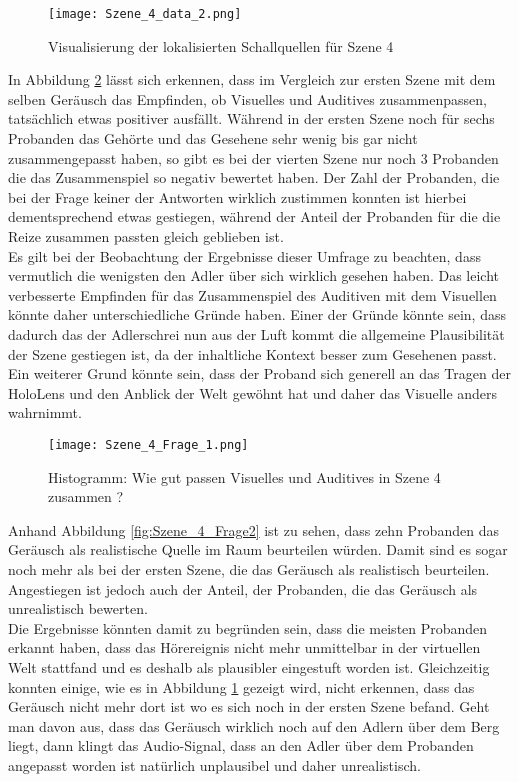    \begin{figure}[H]
\centering
\texttt{[image: Szene\_4\_data\_2.png]}
\caption{Visualisierung der lokalisierten Schallquellen für Szene 4}
\label{fig:Szene_4_data}
\end{figure} 

In Abbildung \ref{fig:Szene_4_Frage1} lässt sich erkennen, dass im Vergleich zur ersten Szene mit dem selben Geräusch das Empfinden, ob Visuelles und Auditives zusammenpassen, tatsächlich etwas positiver ausfällt. Während in der ersten Szene noch für sechs Probanden das Gehörte und das Gesehene sehr wenig bis gar nicht zusammengepasst haben, so gibt es bei der vierten Szene  nur noch 3 Probanden die das Zusammenspiel so negativ bewertet haben. Der Zahl der Probanden, die bei der Frage keiner der Antworten wirklich zustimmen konnten ist hierbei dementsprechend etwas gestiegen, während der Anteil der Probanden für die die Reize zusammen passten gleich geblieben ist.\\ 

Es gilt bei der Beobachtung der Ergebnisse dieser Umfrage zu beachten, dass vermutlich die wenigsten den Adler über sich wirklich gesehen haben. Das leicht verbesserte Empfinden für das Zusammenspiel des Auditiven mit dem Visuellen könnte daher unterschiedliche Gründe haben. Einer der Gründe könnte sein, dass dadurch das der Adlerschrei nun aus der Luft kommt die allgemeine Plausibilität der Szene gestiegen ist, da der inhaltliche Kontext besser zum Gesehenen passt. Ein weiterer Grund könnte sein, dass der Proband sich generell an das Tragen der HoloLens und den Anblick der Welt gewöhnt hat und daher das Visuelle anders wahrnimmt. 


   \begin{figure}[H]
\centering
\texttt{[image: Szene\_4\_Frage\_1.png]}
\caption{Histogramm: Wie gut passen Visuelles und Auditives in Szene 4 zusammen ?}
\label{fig:Szene_4_Frage1}
\end{figure} 

Anhand Abbildung \ref{fig:Szene_4_Frage2} ist zu sehen, dass zehn Probanden das Geräusch als realistische Quelle im Raum beurteilen würden. Damit sind es sogar noch mehr als bei der ersten Szene, die das Geräusch als realistisch beurteilen. Angestiegen ist jedoch auch der Anteil, der Probanden, die das Geräusch als unrealistisch bewerten. \\

Die Ergebnisse könnten damit zu begründen sein, dass die meisten Probanden erkannt haben, dass das Hörereignis nicht mehr unmittelbar in der virtuellen Welt stattfand und es deshalb als plausibler eingestuft worden ist. Gleichzeitig konnten einige, wie es in Abbildung \ref{fig:Szene_4_data} gezeigt wird, nicht erkennen, dass das Geräusch nicht mehr dort ist wo es sich noch in der ersten Szene befand. Geht man davon aus, dass das Geräusch wirklich noch auf den Adlern über dem Berg liegt, dann klingt das Audio-Signal, dass an den Adler über dem Probanden angepasst worden ist natürlich unplausibel und daher unrealistisch. 


